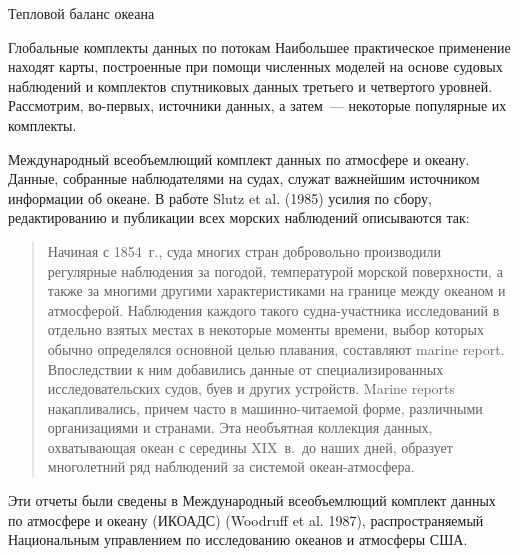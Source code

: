 \begin{chapter}{Тепловой баланс океана}
\begin{section}{Глобальные комплекты данных по потокам}
Наибольшее практическое применение находят карты, построенные при помощи
численных моделей на основе судовых наблюдений и комплектов спутниковых 
данных третьего и четвертого уровней. Рассмотрим, во-первых, источники данных,
а затем~--- некоторые популярные их комплекты.
%

\begin{paragraph}{Международный всеобъемлющий комплект данных по атмосфере 
и океану.}
Данные, собранные наблюдателями на судах, служат важнейшим источником 
информации об океане. В работе Slutz et al. (1985) усилия по сбору, 
редактированию и публикации всех морских наблюдений описываются так:
\begin{quotation}
Начиная с 1854~г., суда многих стран добровольно производили
регулярные наблюдения за погодой, температурой морской 
поверхности, а также за многими другими характеристиками на границе между 
океаном и атмосферой. Наблюдения каждого такого судна-участника исследований 
в отдельно взятых местах в некоторые моменты времени, выбор которых обычно 
определялся основной целью плавания, составляют marine report. 
Впоследствии к ним добавились данные от специализированных 
исследовательских судов, буев и других устройств. Marine reports накапливались,
причем часто в машинно-читаемой форме, различными организациями и странами.
Эта необъятная коллекция данных, охватывающая океан с середины XIX~в.\ до
наших дней, образует многолетний ряд наблюдений за системой океан-атмосфера.
\end{quotation}
Эти отчеты были сведены в Международный всеобъемлющий комплект данных по 
атмосфере и океану (ИКОАДС) (Woodruff et al.  1987), распространяемый
Национальным управлением по исследованию океанов и атмосферы США.
%

\end{paragraph}
\end{section}
\end{chapter}
